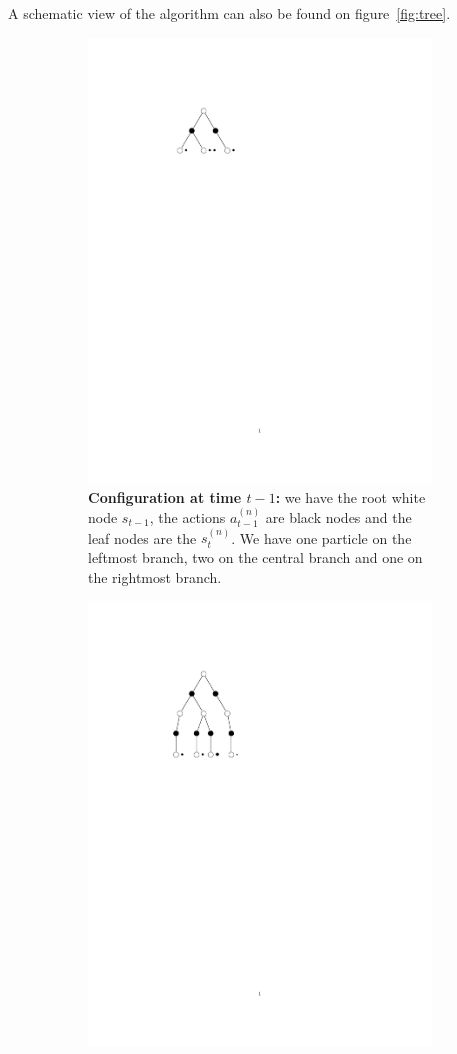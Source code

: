 A schematic view of the algorithm can also be found on figure~\ref{fig:tree}.

\begin{figure}[h!]
\centering
\begin{subfigure}{.30\textwidth}
  \centering
  \includegraphics[width=0.7\linewidth, trim={5cm 17cm 12cm 4cm},clip]{articles/smcp/figures/main_ts1.pdf}
  \caption{\textbf{Configuration at time $t-1$:} we have the root white node $s_{t-1}$, the actions $a^{(n)}_{t-1}$ are black nodes and the leaf nodes are the $s^{(n)}_t$. We have one particle on the leftmost branch, two on the central branch and one on the rightmost branch. }
  \label{fig:sub1}
\end{subfigure}\hspace{.03\linewidth}
\begin{subfigure}{.30\textwidth}
  \centering
  \includegraphics[width=0.7\linewidth, trim={5cm 17cm 12cm 4cm},clip]{articles/smcp/figures/main_ts4.pdf}

\end{subfigure}
\end{figure}
